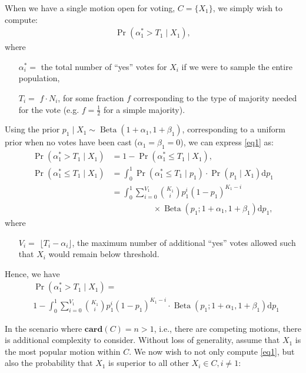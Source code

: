 \documentclass[chi_draft]{sigchi}
\begin{document}
When we have a single motion open for voting, $C=\{X_1\}$, we simply wish to compute:
\begin{align}\label{eq1}
\Pr(\alpha^*_1 > T_1 \mid X_1),
\end{align}
where
\begin{description}
\begin{itemize}
\item[$\alpha^*_i = $] the total number of ``yes'' votes for $X_i$ if we were to sample the entire population,
\item[$T_i = $] $f \cdot N_i$, for some fraction $f$ corresponding to the type of majority needed for the vote
(e.g. $f=\frac{1}{2}$ for a simple majority).
\end{itemize}
\end{description}
Using the prior $p_1 \mid X_1 \sim \operatorname{Beta}(1+\alpha_1,1+\beta_1)$, corresponding to a uniform prior when
no votes have been cast ($\alpha_1 = \beta_1 = 0$), we can express \eqref{eq1} as:
\begin{align*}
\Pr(\alpha^*_1 > T_1 \mid X_1) &= 1 - \Pr(\alpha^*_1 \leq T_1 \mid X_1),\\
\Pr(\alpha^*_1 \leq T_1 \mid X_1) &= \int_0^1 \Pr(\alpha^*_1 \leq T_1 \mid p_1)\cdot \Pr(p_1 \mid X_1) \mathrm{d}p_1\\
&= \int_0^1 \sum\limits_{i=0}^{V_1} {K_1 \choose i} p_1^{i} {(1-p_1)}^{K_1-i} \\
& \qquad\qquad\quad \times \operatorname{Beta}(p_1; 1+\alpha_1,1+\beta_1) \mathrm{d}p_1,
\end{align*}
where
\begin{description}
\begin{itemize}
\item[$V_i = $] $\lfloor{T_i - \alpha_i}\rfloor$, the maximum number of additional ``yes'' votes allowed such that
$X_i$ would remain below threshold.
\end{itemize}
\end{description}

Hence, we have
\begin{align}\label{eq2}
& \Pr(\alpha^*_1 > T_1 \mid X_1) = \nonumber\\
& 1 - \int_0^1 \sum\limits_{i=0}^{V_1} {K_1 \choose i} p_1^{i} {(1-p_1)}^{K_1-i} \cdot \operatorname{Beta}(p_1; 1+\alpha_1,1+\beta_1) \mathrm{d}p_1
\end{align}

In the scenario where $\mathbf{card}(C) = n > 1$, i.e., there are competing motions, there is additional complexity to
consider.
Without loss of generality, assume that $X_1$ is the most popular motion within $C$.
We now wish to not only compute \eqref{eq1}, but also the probability that $X_1$ is superior to all other
$X_i  \in C, i \neq 1$:
\end{document}
